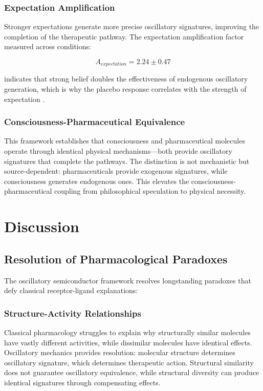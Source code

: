 \documentclass{article}
\theoremstyle{definition}
\theoremstyle{remark}
\begin{document}
\subsubsection{Expectation Amplification}

Stronger expectations generate more precise oscillatory signatures, improving the completion of the therapeutic pathway. The expectation amplification factor measured across conditions:

\begin{equation}
A_{expectation} = 2.24 \pm 0.47
\end{equation}

indicates that strong belief doubles the effectiveness of endogenous oscillatory generation, which is why the placebo response correlates with the strength of expectation \cite{Kaptchuk2008}.

\subsubsection{Consciousness-Pharmaceutical Equivalence}

This framework establishes that consciousness and pharmaceutical molecules operate through identical physical mechanisms—both provide oscillatory signatures that complete the pathways. The distinction is not mechanistic but source-dependent: pharmaceuticals provide exogenous signatures, while consciousness generates endogenous ones. This elevates the consciousness-pharmaceutical coupling from philosophical speculation to physical necessity.


\section{Discussion}

\subsection{Resolution of Pharmacological Paradoxes}

The oscillatory semiconductor framework resolves longstanding paradoxes that defy classical receptor-ligand explanations:

\subsubsection{Structure-Activity Relationships}

Classical pharmacology struggles to explain why structurally similar molecules have vastly different activities, while dissimilar molecules have identical effects. Oscillatory mechanics provides resolution: molecular structure determines oscillatory signature, which determines therapeutic action. Structural similarity does not guarantee oscillatory equivalence, while structural diversity can produce identical signatures through compensating effects.
\end{document}
